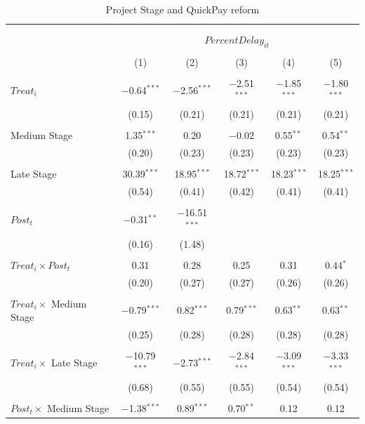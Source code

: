 \documentclass[
]{article}
\begin{document}
\begin{table}[H] \centering 
  \caption{Project Stage and QuickPay reform} 
  \label{} 
\small 
\begin{tabular}{@{\extracolsep{-2pt}}lccccc} 
\\[-1.8ex]\hline 
\hline \\[-1.8ex] 
\\[-1.8ex] & \multicolumn{5}{c}{$PercentDelay_{it}$  } \\ 
\\[-1.8ex] & (1) & (2) & (3) & (4) & (5)\\ 
\hline \\[-1.8ex] 
 $Treat_i$ & $-$0.64$^{***}$ & $-$2.56$^{***}$ & $-$2.51$^{***}$ & $-$1.85$^{***}$ & $-$1.80$^{***}$ \\ 
  & (0.15) & (0.21) & (0.21) & (0.21) & (0.21) \\ 
  & & & & & \\ 
 Medium Stage & 1.35$^{***}$ & 0.20 & $-$0.02 & 0.55$^{**}$ & 0.54$^{**}$ \\ 
  & (0.20) & (0.23) & (0.23) & (0.23) & (0.23) \\ 
  & & & & & \\ 
 Late Stage & 30.39$^{***}$ & 18.95$^{***}$ & 18.72$^{***}$ & 18.23$^{***}$ & 18.25$^{***}$ \\ 
  & (0.54) & (0.41) & (0.42) & (0.41) & (0.41) \\ 
  & & & & & \\ 
 $Post_t$ & $-$0.31$^{**}$ & $-$16.51$^{***}$ &  &  &  \\ 
  & (0.16) & (1.48) &  &  &  \\ 
  & & & & & \\ 
 $Treat_i \times Post_t$ & 0.31 & 0.28 & 0.25 & 0.31 & 0.44$^{*}$ \\ 
  & (0.20) & (0.27) & (0.27) & (0.26) & (0.26) \\ 
  & & & & & \\ 
 $Treat_i \times$ Medium Stage & $-$0.79$^{***}$ & 0.82$^{***}$ & 0.79$^{***}$ & 0.63$^{**}$ & 0.63$^{**}$ \\ 
  & (0.25) & (0.28) & (0.28) & (0.28) & (0.28) \\ 
  & & & & & \\ 
 $Treat_i \times$ Late Stage & $-$10.79$^{***}$ & $-$2.73$^{***}$ & $-$2.84$^{***}$ & $-$3.09$^{***}$ & $-$3.33$^{***}$ \\ 
  & (0.68) & (0.55) & (0.55) & (0.54) & (0.54) \\ 
  & & & & & \\ 
 $Post_t \times$ Medium Stage & $-$1.38$^{***}$ & 0.89$^{***}$ & 0.70$^{**}$ & 0.12 & 0.12 \\ 

\end{tabular}
\end{table}
\end{document}
